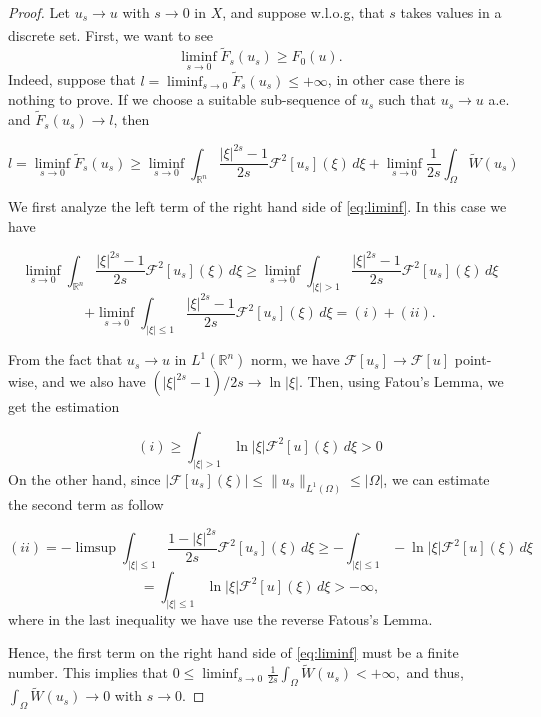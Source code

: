 \documentclass{amsart}
\newcommand{\rn}{{\mathbb{R}^n}}
\newcommand{\Fu}{\mathcal{F}}
\newcommand{\W}{\Omega}
\theoremstyle{remark}
\theoremstyle{definition}
\numberwithin{equation}{section}
\begin{document}
\begin{proof}
Let $u_s \xrightarrow[]{} u$ with $s \rightarrow 0$ in $X$, and suppose w.l.o.g, that $s$ takes values in a discrete set. First, we want to see 
\begin{equation}
\liminf_{s \rightarrow 0} \tilde{F}_s(u_s) \geq F_0(u).
\label{eq:liminff}
\end{equation}  
Indeed, suppose that $l = \liminf_{s \to 0}{\tilde{F}_s(u_s)} \leq +\infty$, in other case there is nothing to prove. If we choose a suitable sub-sequence of $u_s$ such that $u_s \to u$ a.e. and $\tilde{F}_s(u_s) \to l$, then

\begin{equation}
l = \liminf_{s \to 0}{ \tilde{F}_s(u_s) } \geq \liminf_{s \to 0}{ \int_{\rn} \frac{|\xi|^{2s}-1}{2s}} \Fu^2[u_s](\xi) \, d\xi + \liminf_{s \to 0}{\frac{1}{2s}\int_{\Omega} \tilde{W}(u_s)}
\label{eq:liminf}
\end{equation}   

We first analyze the left term of the right hand side of \eqref{eq:liminf}.
In this case we have  

$$ \liminf_{s \to 0}{ \int_{\rn} \frac{|\xi|^{2s}-1}{2s}} \Fu^2[u_s](\xi) \, d\xi \geq \liminf_{s \to 0}{ \int_{|\xi|>1} \frac{|\xi|^{2s}-1}{2s}} \Fu^2[u_s](\xi) \, d\xi $$ 
$$ + \liminf_{s \to 0}{ \int_{|\xi|\leq1} \frac{|\xi|^{2s}-1}{2s}} \Fu^2[u_s](\xi) \, d\xi = (i) + (ii).$$

From the fact that $u_s \to u$ in $L^1(\rn)$ norm, we have $\Fu[u_s] \to \Fu[u]$ point-wise, and we also have $(|\xi|^{2s}-1)/2s \to \ln{|\xi|}$. Then, using Fatou's Lemma, we get the estimation

$$(i) \geq   \int_{|\xi|>1} \ln{|\xi|}\Fu^2[u](\xi) \, d\xi >0 $$ 
On the other hand, since $|\Fu[u_s](\xi)| \leq \|u_s\|_{L^1(\Omega)} \leq |\W|$, we can estimate the second term as follow

$$(ii) = - \limsup  \int_{|\xi|\leq1} \frac{1-|\xi|^{2s}}{2s} \Fu^2[u_s](\xi) \, d\xi \geq - \int_{|\xi|\leq1} -\ln{|\xi|} \Fu^2[u](\xi) \, d\xi$$
\begin{equation}
=\int_{|\xi|\leq1} \ln{|\xi|} \Fu^2[u](\xi) \, d\xi > -\infty,  
\label{eq:est}
\end{equation}
where in the last inequality we have use the reverse Fatous's Lemma.


 Hence, the first term on the right hand side of \eqref{eq:liminf} must be a finite number. This implies that  
$0 \leq \liminf_{s \to 0} \frac{1}{2s}\int_{\Omega} \tilde{W}(u_s) < +\infty, $
and thus, $\int_{\Omega} \tilde{W}(u_s) \to 0 $ with $s \to 0$. 


\end{proof}
\end{document}
